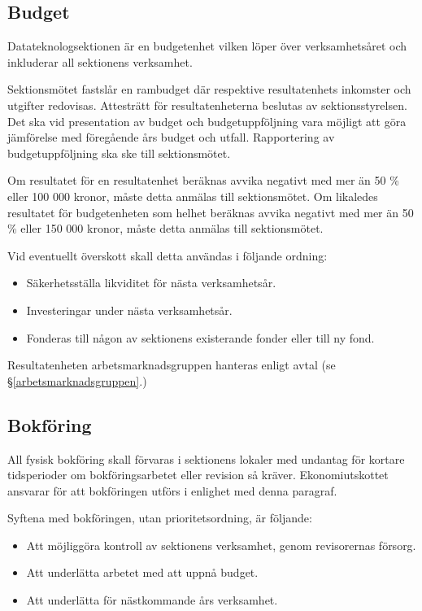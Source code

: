 \documentclass{datateknologsektionen-document}
\begin{document}
\subsection{Budget}
Datateknologsektionen är en budgetenhet vilken löper över verksamhetsåret och
inkluderar all sektionens verksamhet.

Sektionsmötet fastslår en rambudget där respektive resultatenhets inkomster och
utgifter redovisas. Attesträtt för resultatenheterna beslutas av sektionsstyrelsen.
Det ska vid presentation av budget och budgetuppföljning vara möjligt att göra
jämförelse med föregående års budget och utfall. Rapportering av budgetuppföljning
ska ske till sektionsmötet.

Om resultatet för en resultatenhet beräknas avvika negativt med mer än 50 \% eller
100 000 kronor, måste detta anmälas till sektionsmötet. Om likaledes resultatet för
budgetenheten som helhet beräknas avvika negativt med mer än 50 \% eller 150 000 kronor,
måste detta anmälas till sektionsmötet.

Vid eventuellt överskott skall detta användas i följande ordning:
\begin{itemize}
  \item Säkerhetsställa likviditet för nästa verksamhetsår.
  \item Investeringar under nästa verksamhetsår.
  \item Fonderas till någon av sektionens existerande fonder eller till ny fond.
\end{itemize}

Resultatenheten arbetsmarknadsgruppen hanteras enligt avtal (se \S \ref{arbetsmarknadsgruppen}.)

\subsection{Bokföring}
All fysisk bokföring skall förvaras i sektionens lokaler med undantag för kortare
tidsperioder om bokföringsarbetet eller revision så kräver. Ekonomiutskottet ansvarar för att bokföringen utförs i enlighet med denna paragraf.

Syftena med bokföringen, utan prioritetsordning, är följande:
\begin{itemize}
  \item Att möjliggöra kontroll av sektionens verksamhet, genom revisorernas försorg.
  \item Att underlätta arbetet med att uppnå budget.
  \item Att underlätta för nästkommande års verksamhet.
\end{itemize}
\end{document}
